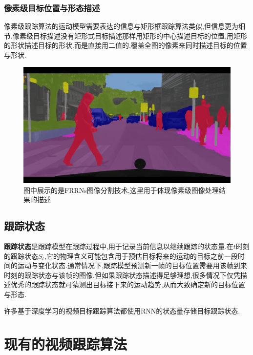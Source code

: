 \subsubsection{像素级目标位置与形态描述}
像素级跟踪算法的运动模型需要表达的信息与矩形框跟踪算法类似,但信息更为细节.像素级目标描述没有矩形式目标描述那样用矩形的中心描述目标的位置,用矩形的形状描述目标的形状.而是直接用二值的,覆盖全图的像素来同时描述目标的位置与形状.
\par
\begin{figure}[htbp!]
    \centering
    \includegraphics[width = 1.\textwidth]{chap/img/maxresdefault.jpg}
    \caption{图中展示的是FRRNs图像分割技术\supercite{frnn_youtube}\supercite{pohlen2017full},这里用于体现像素级图像处理结果的描述}
    \label{fig:bunding_boxes}
\end{figure}
\par

\subsection{跟踪状态} \label{section:tracking_state}
\textbf{跟踪状态}是跟踪模型在跟踪过程中,用于记录当前信息以继续跟踪的状态量.在$t$时刻的跟踪状态$S_t$,它的物理含义可能包含用于预估目标将来的运动的目标之前一段时间的运动与变化状态.通常情况下,跟踪模型预测新一帧的目标位置需要用该帧到来时刻的跟踪状态与该帧的图像,但如果跟踪状态描述得足够理想,很多情况下仅凭描述优秀的跟踪状态就可猜测出目标接下来的运动趋势,从而大致确定新的目标位置与形态.
\par
许多基于深度学习的视频目标跟踪算法都使用RNN的状态量存储目标跟踪状态.


\section{现有的视频跟踪算法}

